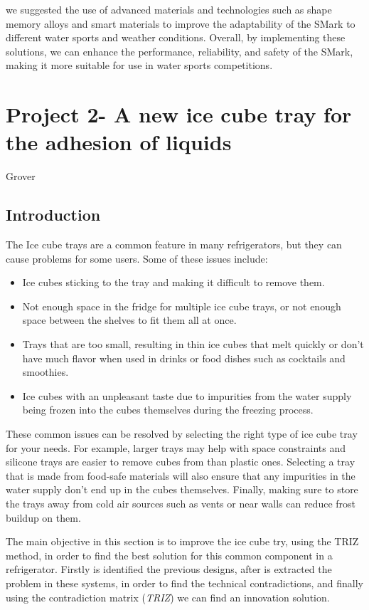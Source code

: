 \documentclass[12pt, twoside]{report}
\begin{document}
we suggested the use of advanced materials and technologies such as shape memory alloys and smart materials to improve the adaptability of the SMark to different water sports and weather conditions. Overall, by implementing these solutions, we can enhance the performance, reliability, and safety of the SMark, making it more suitable for use in water sports competitions.

\newpage
\chapter{Project 2- \LARGE A new ice cube tray for the adhesion of liquids}
Grover
\section{Introduction}
The Ice cube trays are a common feature in many refrigerators, but they can cause problems for some users. Some of these issues include:
\begin{itemize}
    \item Ice cubes sticking to the tray and making it difficult to remove them.
    \item Not enough space in the fridge for multiple ice cube trays, or not enough space between the shelves to fit them all at once.
    \item Trays that are too small, resulting in thin ice cubes that melt quickly or don't have much flavor when used in drinks or food dishes such as cocktails and smoothies.
    \item Ice cubes with an unpleasant taste due to impurities from the water supply being frozen into the cubes themselves during the freezing process.
\end{itemize}
These common issues can be resolved by selecting the right type of ice cube tray for your needs. For example, larger trays may help with space constraints and silicone trays are easier to remove cubes from than plastic ones. Selecting a tray that is made from food-safe materials will also ensure that any impurities in the water supply don't end up in the cubes themselves. Finally, making sure to store the trays away from cold air sources such as vents or near walls can reduce frost buildup on them.

The main objective in this section is to improve the ice cube try, using the TRIZ method, in order to find the best solution for this common component in a refrigerator. Firstly is identified the previous designs, after is extracted the problem in these systems, in order to find the technical contradictions, and finally using the contradiction matrix (\textit{TRIZ}) we can find an innovation solution.
\end{document}
